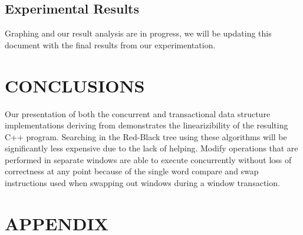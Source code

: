\documentclass[letterpaper, 10 pt, conference]{ieeeconf}
\begin{document}
\subsection{Experimental Results}

Graphing and our result analysis are in progress, we will be updating this document with the final results from our experimentation.

	\section{CONCLUSIONS}
	
	Our presentation of both the concurrent and transactional data structure implementations deriving from \cite{c1} demonstrates the linearizibility of the resulting C++ program. Searching in the Red-Black tree using these algorithms will be significantly less expensive due to the lack of helping. Modify operations that are performed in separate windows are able to execute concurrently without loss of correctness at any point because of the single word compare and swap instructions used when swapping out windows during a window transaction.

	
	\section*{APPENDIX}
	
\end{document}
